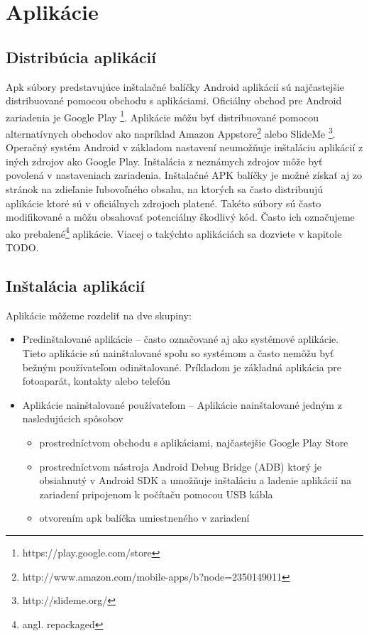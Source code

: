 
\section{Aplikácie}
\subsection{Distribúcia aplikácií}

Apk súbory predstavujúce inštalačné balíčky Android aplikácií sú najčastejšie distribuované pomocou obchodu s aplikáciami. Oficiálny obchod pre Android zariadenia je Google Play \footnote{https://play.google.com/store}. Aplikácie môžu byť distribuované pomocou alternatívnych obchodov ako napríklad Amazon Appstore\footnote{http://www.amazon.com/mobile-apps/b?node=2350149011} alebo SlideMe \footnote{http://slideme.org/}. Operačný systém Android v základom nastavení neumožňuje inštaláciu aplikácií z iných zdrojov ako Google Play. Inštalácia z neznámych zdrojov môže byť povolená v nastaveniach zariadenia. Inštalačné APK balíčky je možné získať aj zo stránok na zdieľanie ľubovoľného obsahu, na ktorých sa často distribuujú aplikácie ktoré sú v oficiálnych zdrojoch platené. Takéto súbory sú často modifikované a môžu obsahovať potenciálny škodlivý kód. Často ich označujeme ako prebalené\footnote{angl. repackaged} aplikácie. Viacej o takýchto aplikáciách sa dozviete v kapitole TODO.

\subsection{Inštalácia aplikácií}
Aplikácie môžeme rozdeliť na dve skupiny:\\
\begin{itemize}
\item Predinštalované aplikácie – často označované aj ako systémové aplikácie. Tieto aplikácie sú nainštalované spolu so systémom a často nemôžu byť bežným používateľom odinštalované. Príkladom je základná aplikácia pre fotoaparát, kontakty alebo telefón
\item Aplikácie nainštalované používateľom – Aplikácie nainštalované jedným z nasledujúcich spôsobov
\begin{itemize}
\item prostredníctvom obchodu s aplikáciami, najčastejšie Google Play Store
\item prostredníctvom nástroja Android Debug Bridge (ADB) ktorý je obsiahnutý v Android SDK a umožňuje inštaláciu a ladenie aplikácií na zariadení pripojenom k počítaču pomocou USB kábla
\item otvorením apk balíčka umiestneného v zariadení
\end{itemize}
\end{itemize}

